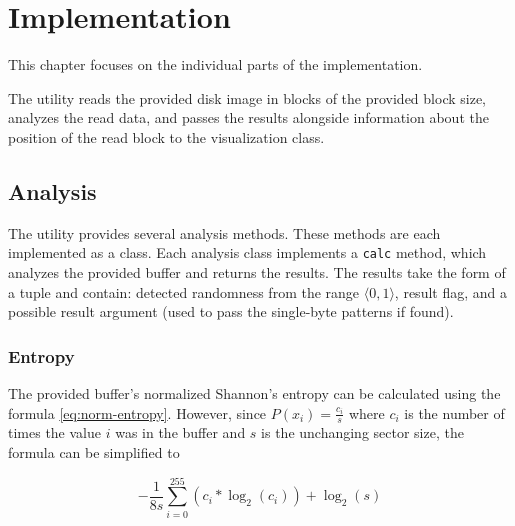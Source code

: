 \documentclass[
  digital, %
  color,   %
  oneside, %
  lof,     %
  nolot,     %
]{fithesis4}
\begin{document}
\chapter{Implementation}
\label{chap:implementation}
This chapter focuses on the individual parts of the implementation.

The utility reads the provided disk image in blocks of the provided block size, analyzes the read data, and passes the results alongside information about the position of the read block to the visualization class.

\section{Analysis}
\label{sec:analysis2}
The utility provides several analysis methods.
These methods are each implemented as a class.
Each analysis class implements a \texttt{calc} method, which analyzes the provided buffer and returns the results.
The results take the form of a tuple and contain: detected randomness from the range $\langle0,1\rangle$, result flag, and a possible result argument (used to pass the single-byte patterns if found).

\subsection{Entropy}
\label{ssec:entropy}

The provided buffer's normalized Shannon's entropy can be calculated using the formula \eqref{eq:norm-entropy}.
However, since $P(x_i) = \frac{c_i}{s}$ where $c_i$ is the number of times the value $i$ was in the buffer and $s$ is the unchanging sector size, the formula can be simplified to

\begin{equation}
 -\frac{1}{8s}\sum_{i=0}^{255}(c_i * \log_2(c_i)) + \log_2(s)
 \label{eq:impl-entropy}
\end{equation}
\end{document}
